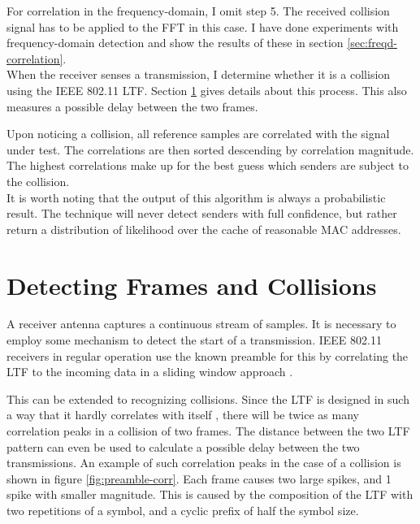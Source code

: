 For correlation in the frequency-domain, I omit step 5. The received collision signal has to be applied to the \gls{FFT} in this case. I have done experiments with frequency-domain detection and show the results of these in section \ref{sec:freqd-correlation}.\\

When the receiver senses a transmission, I determine whether it is a collision using the IEEE 802.11 \gls{LTF}. Section \ref{sec:preamble-corr} gives details about this process. This also measures a possible delay between the two frames.

Upon noticing a collision, all reference samples are correlated with the signal under test. The correlations are then sorted descending by correlation magnitude. The highest correlations make up for the best guess which senders are subject to the collision.\\

It is worth noting that the output of this algorithm is always a probabilistic result. The technique will never detect senders with full confidence, but rather return a distribution of likelihood over the cache of reasonable \gls{MAC} addresses.



\section{Detecting Frames and Collisions}\label{sec:preamble-corr}

A receiver antenna captures a continuous stream of samples. It is necessary to employ some mechanism to detect the start of a transmission. IEEE 802.11 receivers in regular operation use the known preamble for this by correlating the \gls{LTF} to the incoming data in a sliding window approach \cite{perahia2013}.

This can be extended to recognizing collisions. Since the \gls{LTF} is designed in such a way that it hardly correlates with itself \cite{ieee2012}, there will be twice as many correlation peaks in a collision of two frames. The distance between the two \gls{LTF} pattern can even be used to calculate a possible delay between the two transmissions. An example of such correlation peaks in the case of a collision is shown in figure \ref{fig:preamble-corr}. Each frame causes two large spikes, and 1 spike with smaller magnitude. This is caused by the composition of the \gls{LTF} with two repetitions of a symbol, and a cyclic prefix of half the symbol size.\\

